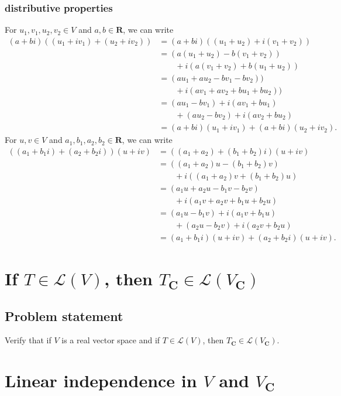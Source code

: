 \documentclass{article}
\begin{document}
\subsubsection*{distributive properties}
For $u_1,v_1,u_2,v_2\in V$ and $a,b\in\mathbf{R}$, we can write
\begin{align*}
    (a+bi)((u_1+iv_1)+(u_2+iv_2))&=(a+bi)((u_1+u_2)+i(v_1+v_2))\\
    &=(a(u_1+u_2)-b(v_1+v_2))\\
    &\qquad+i(a(v_1+v_2) + b(u_1+u_2))\\
    &=(au_1+au_2-bv_1-bv_2))\\
    &\qquad+i(av_1+av_2 + bu_1+bu_2))\\
    &=(au_1-bv_1)+i(av_1+bu_1)\\
    &\qquad+(au_2-bv_2)+i(av_2+bu_2)\\
    &=(a+bi)(u_1+iv_1)+(a+bi)(u_2+iv_2).
\end{align*}
For $u,v\in V$ and $a_1,b_1,a_2,b_2\in\mathbf{R}$, we can write
\begin{align*}
    ((a_1+b_1i)+(a_2+b_2i))(u+iv)&=((a_1+a_2)+(b_1+b_2)i)(u+iv)\\
    &=((a_1+a_2)u-(b_1+b_2)v)\\
    &\qquad+i((a_1+a_2)v+(b_1+b_2)u)\\
    &=(a_1u+a_2u-b_1v-b_2v)\\
    &\qquad+i(a_1v+a_2v+b_1u+b_2u)\\
    &=(a_1u-b_1v)+i(a_1v+b_1u)\\
    &\qquad+(a_2u-b_2v)+i(a_2v+b_2u)\\
    &=(a_1+b_1i)(u+iv)+(a_2+b_2i)(u+iv).
\end{align*}

\clearpage

\section{If $T\in\mathcal{L}(V)$, then $T_{\mathbf{C}}\in\mathcal{L}(V_{\mathbf{C}})$}
\subsection*{Problem statement}
Verify that if $V$ is a real vector space and if $T\in\mathcal{L}(V)$, then $T_{\mathbf{C}}\in\mathcal{L}(V_{\mathbf{C}})$.

\clearpage

\section{Linear independence in $V$ and $V_{\mathbf{C}}$}
\end{document}
